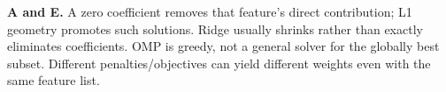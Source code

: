 \textbf{A and E.} A zero coefficient removes that feature's direct contribution; L1 geometry promotes such solutions. Ridge usually shrinks rather than exactly eliminates coefficients. OMP is greedy, not a general solver for the globally best subset. Different penalties/objectives can yield different weights even with the same feature list.
